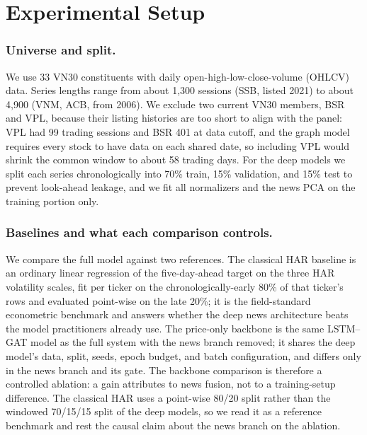\documentclass[runningheads]{llncs}
\newcommand{\ntick}{33}
\begin{document}
\section{Experimental Setup}
\label{sec:setup}

\subsubsection{Universe and split.}
We use \ntick{} VN30 constituents with daily open-high-low-close-volume (OHLCV) data. Series lengths range from about 1{,}300
sessions (SSB, listed 2021) to about 4{,}900 (VNM, ACB, from 2006). We exclude two current VN30
members, BSR and VPL, because their listing histories are too short to align with the panel: VPL
had 99 trading sessions and BSR 401 at data cutoff, and the graph model requires every stock to
have data on each shared date, so including VPL would shrink the common window to about 58 trading
days. For the deep models we split each series chronologically into 70\% train, 15\% validation, and
15\% test to prevent look-ahead leakage, and we fit all normalizers and the news PCA on the training
portion only.

\subsubsection{Baselines and what each comparison controls.}
We compare the full model against two references. The classical HAR baseline is an ordinary linear
regression of the five-day-ahead target on the three HAR volatility scales, fit per ticker on the
chronologically-early 80\% of that ticker's rows and evaluated point-wise on the late 20\%; it is
the field-standard econometric benchmark and answers whether the deep news architecture beats the
model practitioners already use. The price-only backbone is the same LSTM--GAT model as the full
system with the news branch removed; it shares the deep model's data, split, seeds, epoch budget,
and batch configuration, and differs only in the news branch and its gate. The backbone comparison
is therefore a controlled ablation: a gain attributes to news fusion, not to a training-setup
difference. The classical HAR uses a point-wise 80/20 split rather than the windowed 70/15/15 split
of the deep models, so we read it as a reference benchmark and rest the causal claim about the news
branch on the ablation.
\end{document}
